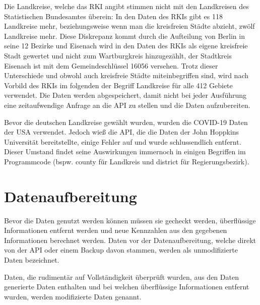 
Die Landkreise, welche das RKI angibt stimmen nicht mit den Landkreisen des Statistischen Bundesamtes überein: In den Daten des RKIs gibt es 118 Landkreise mehr, beziehungsweise wenn man die kreisfreien Städte abzieht, zwölf Landkreise mehr. Diese Diskrepanz kommt durch die Aufteilung von Berlin in seine 12 Bezirke und Eisenach wird in den Daten des RKIs als eigene kreisfreie Stadt gewertet und nicht zum Wartburgkreis hinzugezählt, der Stadtkreis Eisenach ist mit dem Gemeindeschlüssel 16056 versehen. Trotz dieser Unterschiede und obwohl auch kreisfreie Städte miteinbegriffen sind, wird nach Vorbild des RKIs im folgenden der Begriff \glqq{}Landkreise\grqq{} für alle 412 Gebiete verwendet.
Die Daten werden abgespeichert, damit nicht bei jeder Ausführung eine zeitaufwendige Anfrage an die API zu stellen und die Daten aufzubereiten.

Bevor die deutschen Landkreise gewählt wurden, wurden die COVID-19 Daten der USA verwendet. Jedoch wieß die API, die die Daten der John Hoppkins Universität bereitstellte, einige Fehler auf und wurde schlussendlich entfernt.
Dieser Umstand findet seine Auswirkungen immernoch in einigen Begriffen im Programmcode (bspw. \glqq{}county\grqq{} für Landkreis und \glqq{}district\grqq{} für Regierungsbezirk).

\section{Datenaufbereitung}
Bevor die Daten genutzt werden können müssen sie gecheckt werden, überflüssige Informationen entfernt werden und neue Kennzahlen aus den gegebenen Informationen berechnet werden. Daten vor der Datenaufbereitung, welche direkt von der API oder einem Backup davon stammen, werden als \glqq{}unmodifizierte\grqq{} Daten bezeichnet. 

Daten, die rudimentär auf Vollständigkeit überprüft wurden, aus den Daten generierte Daten enthalten und bei welchen überflüssige Informationen entfernt wurden, werden \glqq{}modifizierte\grqq{} Daten genannt.

